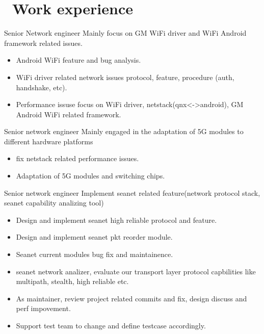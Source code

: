 \documentclass{resume}
\begin{document}



\section{\faUsers\ Work experience}
 {Senior Network engineer}
Mainly focus on GM WiFi driver and WiFi Android framework related issues.
\begin{itemize}
\item Android WiFi feature and bug analysis.
\item WiFi driver related network issues protocol, feature, procedure (auth, handshake, etc).
\item Performance issuse focus on WiFi driver, netstack(qnx<->android), GM Android WiFi related framework.
\end{itemize}

 {Senior network engineer}
Mainly engaged in the adaptation of 5G modules to different hardware platforms
\begin{itemize}
\item fix netstack related performance issues.
\item Adaptation of 5G modules and switching chips.
\end{itemize}

 {Senior network engineer}
Implement seanet related feature(network protocol stack,  seanet capability analizing tool)
\begin{itemize}
\item Design and implement seanet high reliable protocol and feature.
\item Design and implement seanet pkt reorder module.
\item Seanet current modules bug fix and maintainence.
\item seanet network analizer, evaluate our transport layer protocol capbilities like multipath, stealth, high reliable etc.
\item As maintainer, review project related commits and fix, design discuss and perf impovement.
\item Support test team to change and define testcase accordingly.
\end{itemize}
\end{document}
